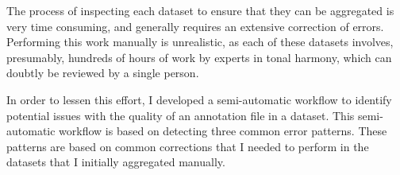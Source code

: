 
The process of inspecting each dataset to ensure that they
can be aggregated is very time consuming, and generally
requires an extensive correction of errors. Performing this
work manually is unrealistic, as each of these datasets
involves, presumably, hundreds of hours of work by experts
in tonal harmony, which can doubtly be reviewed by a single
person.

In order to lessen this effort, I developed a semi-automatic
workflow to identify potential issues with the quality of an
annotation file in a dataset. This semi-automatic workflow
is based on detecting three common error patterns. These
patterns are based on common corrections that I needed to
perform in the datasets that I initially aggregated
manually.

